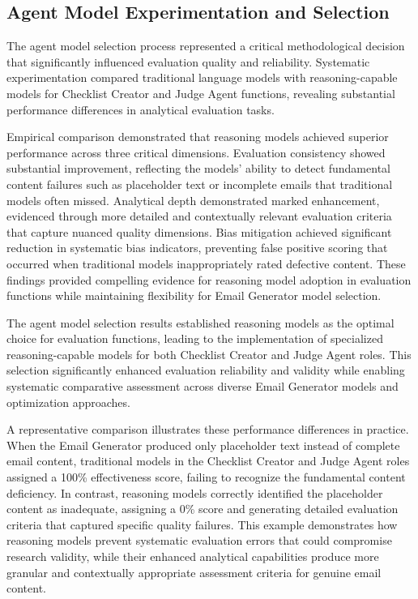 \subsection{Agent Model Experimentation and Selection}

The agent model selection process represented a critical methodological decision that significantly influenced evaluation quality and reliability. Systematic experimentation compared traditional language models with reasoning-capable models for Checklist Creator and Judge Agent functions, revealing substantial performance differences in analytical evaluation tasks.

Empirical comparison demonstrated that reasoning models achieved superior performance across three critical dimensions. Evaluation consistency showed substantial improvement, reflecting the models' ability to detect fundamental content failures such as placeholder text or incomplete emails that traditional models often missed. Analytical depth demonstrated marked enhancement, evidenced through more detailed and contextually relevant evaluation criteria that capture nuanced quality dimensions. Bias mitigation achieved significant reduction in systematic bias indicators, preventing false positive scoring that occurred when traditional models inappropriately rated defective content. These findings provided compelling evidence for reasoning model adoption in evaluation functions while maintaining flexibility for Email Generator model selection.

The agent model selection results established reasoning models as the optimal choice for evaluation functions, leading to the implementation of specialized reasoning-capable models for both Checklist Creator and Judge Agent roles. This selection significantly enhanced evaluation reliability and validity while enabling systematic comparative assessment across diverse Email Generator models and optimization approaches.

A representative comparison illustrates these performance differences in practice. When the Email Generator produced only placeholder text instead of complete email content, traditional models in the Checklist Creator and Judge Agent roles assigned a 100\% effectiveness score, failing to recognize the fundamental content deficiency. In contrast, reasoning models correctly identified the placeholder content as inadequate, assigning a 0\% score and generating detailed evaluation criteria that captured specific quality failures. This example demonstrates how reasoning models prevent systematic evaluation errors that could compromise research validity, while their enhanced analytical capabilities produce more granular and contextually appropriate assessment criteria for genuine email content.

